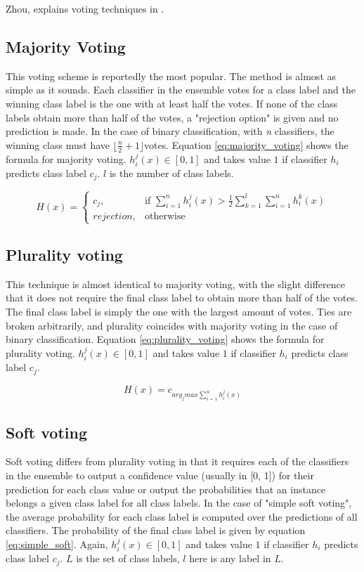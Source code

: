 Zhou, explains voting techniques in \citep[72-75]{zhou2012ensemble}.
\subsection{Majority Voting}
This voting scheme is reportedly the most popular. The method is almost as simple as it sounds. Each classifier in the ensemble votes for a class label and the winning class label is the one with at least half the votes. If none of the class labels obtain more than half of the votes, a "rejection option" is given and no prediction is made. In the case of binary classification, with \textit{n} classifiers, the winning class must have $\lfloor \frac{n}{2} + 1\rfloor$votes. Equation \ref{eq:majority_voting} shows the formula for majority voting. $h_i^j(x) \in [0,1]$ and takes value $1$ if classifier $h_i$ predicts class label $c_j$. $l$ is the number of class labels.

\begin{equation}
    H(x) = 
\begin{cases}
    c_j,& \text{if } \sum^n_{i=1}h^j_i(x) > \frac{1}{2}\sum_{k=1}^{l}\sum_{i=1}^n h_i^k(x)\\
    rejection,              & \text{otherwise}
\end{cases}
\label{eq:majority_voting}
\end{equation} 
\subsection{Plurality voting}
This technique is almost identical to majority voting, with the slight difference that it does not require the final class label to obtain more than half of the votes. The final class label is simply the one with the largest amount of votes. Ties are broken arbitrarily, and plurality coincides with majority voting in the case of binary classification. Equation \ref{eq:plurality_voting} shows the formula for plurality voting. $h_i^j(x) \in [0,1]$ and takes value $1$ if classifier $h_i$ predicts class label $c_j$.

\begin{equation}
H(x) = c_{arg_j max\sum^n_{i=1}h^j_i(x)}
\label{eq:plurality_voting}
\end{equation}
\subsection{Soft voting}
Soft voting differs from plurality voting in that it requires each of the classifiers in the ensemble to output a confidence value (usually in [0, 1]) for their prediction for each class value or output the probabilities that an instance belongs a given class label for all class labels.
In the case of "simple soft voting", the average probability for each class label is computed over the predictions of all classifiers. The probability of the final class label is given by equation \ref{eq:simple_soft}. Again, $h_i^j(x) \in [0,1]$ and takes value $1$ if classifier $h_i$ predicts class label $c_j$. $L$ is the set of class labels, $l$ here is any label in $L$.

